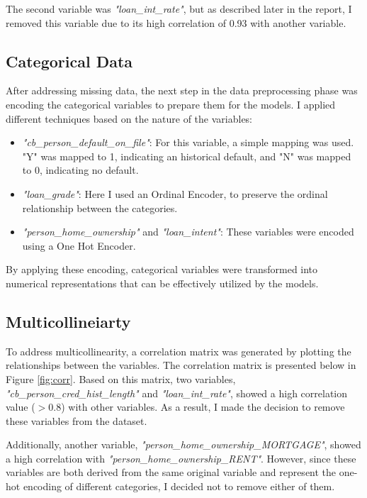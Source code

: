 \documentclass{article}
\begin{document}
The  second variable was \emph{"loan\_int\_rate"}, but as described later in the report, I removed this variable due to its high correlation of 0.93 with another variable.

\subsection{Categorical Data}\label{subsec:cat-data}
After addressing missing data, the next step in the data preprocessing phase was encoding the categorical variables to prepare them for the models. I applied different techniques based on the nature of the variables:
\begin{itemize}
    \item \emph{"cb\_person\_default\_on\_file"}: For this variable, a simple mapping was used. "Y" was mapped to 1, indicating an historical default, and "N" was mapped to 0, indicating no default.
    \item \emph{"loan\_grade"}: Here I used an Ordinal Encoder, to preserve the ordinal relationship between the categories.
    \item \emph{"person\_home\_ownership"} and \emph{"loan\_intent"}: These variables were encoded using a One Hot Encoder.
\end{itemize}
By applying these encoding, categorical variables were transformed into numerical representations that can be effectively utilized by the models.

\subsection{Multicollineiarty}\label{subsec:multicollineiarty}
To address multicollinearity, a correlation matrix was generated by plotting the relationships between the variables. The correlation matrix is presented below in Figure \ref{fig:corr}. Based on this matrix, two variables, \emph{"cb\_person\_cred\_hist\_length"} and \emph{"loan\_int\_rate"}, showed a high correlation value ($>0.8$) with other variables. As a result, I made the decision to remove these variables from the dataset.

Additionally, another variable, \emph{"person\_home\_ownership\_MORTGAGE"}, showed a high correlation with \emph{"person\_home\_ownership\_RENT"}. However, since these variables are both derived from the same original variable and represent the one-hot encoding of different categories, I decided not to remove either of them.  
 
\end{document}
